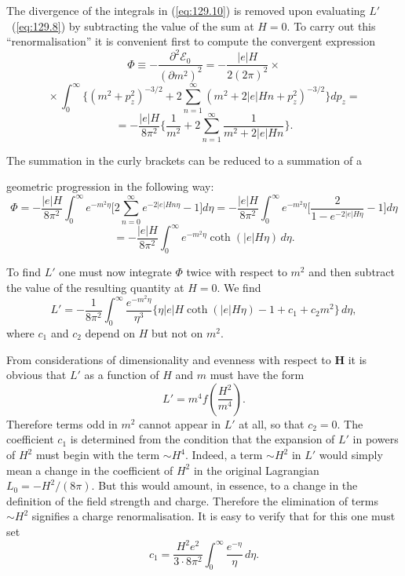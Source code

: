 The divergence of the integrals in (\ref{eq:129.10}) is removed upon evaluating $L'$~(\ref{eq:129.8}) by subtracting the value of the sum at $H=0$. To carry out this ``renormalisation'' it is convenient first to compute the convergent expression
\[
\Phi \equiv -\frac{\partial^2\mathcal{E}_0}{(\partial m^2)^2} = -\frac{|e|H}{2(2\pi)^2}\times
\]
\[
{}\times\int_0^{\infty}\biggl\{(m^2+p_z^2)^{-3/2}+2\sum_{n=1}^{\infty}(m^2+2|e|Hn+p_z^2)^{-3/2}\biggr\}dp_z =
\]
\[
{}= -\frac{|e|H}{8\pi^2}\biggl\{\frac{1}{m^2}+2\sum_{n=1}^{\infty}\frac{1}{m^2+2|e|Hn}\biggr\}.
\]

The summation in the curly brackets can be reduced to a summation of a


\noindent geometric progression in the following way:
\begin{equation}
\Phi = -\frac{|e|H}{8\pi^2}\int_0^{\infty}e^{-m^2\eta}\biggl[2\sum_{n=0}^{\infty}e^{-2|e|Hn\eta}-1\biggr]d\eta = -\frac{|e|H}{8\pi^2}\int_0^{\infty}e^{-m^2\eta}\biggl[\frac{2}{1-e^{-2|e|H\eta}}-1\biggr]d\eta
\label{eq:129.11}
\end{equation}
\[
{}= -\frac{|e|H}{8\pi^2}\int_0^{\infty}e^{-m^2\eta}\operatorname{coth}(|e|H\eta)\,d\eta.
\]

To find $L'$ one must now integrate $\Phi$ twice with respect to $m^2$ and then subtract the value of the resulting quantity at $H = 0$. We find
\begin{equation}
L' = -\frac{1}{8\pi^2}\int_0^{\infty}\frac{e^{-m^2\eta}}{\eta^3}\bigl\{\eta|e|H\coth(|e|H\eta) - 1 + c_1 + c_2 m^2\bigr\}\,d\eta,
\label{eq:129.12}
\end{equation}
where $c_1$ and $c_2$ depend on $H$ but not on $m^2$.

From considerations of dimensionality and evenness with respect to $\mathbf{H}$ it is obvious that $L'$ as a function of $H$ and $m$ must have the form
\[
L' = m^4 f\!\left(\frac{H^2}{m^4}\right).
\]
Therefore terms odd in $m^2$ cannot appear in $L'$ at all, so that $c_2 = 0$. The coefficient $c_1$ is determined from the condition that the expansion of $L'$ in powers of $H^2$ must begin with the term $\sim H^4$. Indeed, a term $\sim H^2$ in $L'$ would simply mean a change in the coefficient of $H^2$ in the original Lagrangian $L_0 = -H^2/(8\pi)$. But this would amount, in essence, to a change in the definition of the field strength and charge. Therefore the elimination of terms $\sim H^2$ signifies a charge renormalisation. It is easy to verify that for this one must set
\[
c_1 = \frac{H^2 e^2}{3\cdot 8\pi^2}\int_0^{\infty}\frac{e^{-\eta}}{\eta}\,d\eta.
\]

